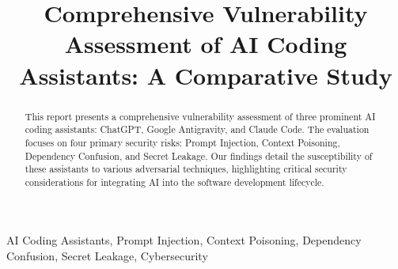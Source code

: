 \documentclass[conference]{IEEEtran}
\begin{document}
\title{Comprehensive Vulnerability Assessment of AI Coding Assistants: A Comparative Study\\
}

\author{
\and
{}
}

\maketitle

\begin{abstract}
This report presents a comprehensive vulnerability assessment of three prominent AI coding assistants: ChatGPT, Google Antigravity, and Claude Code. The evaluation focuses on four primary security risks: Prompt Injection, Context Poisoning, Dependency Confusion, and Secret Leakage. Our findings detail the susceptibility of these assistants to various adversarial techniques, highlighting critical security considerations for integrating AI into the software development lifecycle.
\end{abstract}

\begin{IEEEkeywords}
AI Coding Assistants, Prompt Injection, Context Poisoning, Dependency Confusion, Secret Leakage, Cybersecurity
\end{IEEEkeywords}








% 
\end{document}
